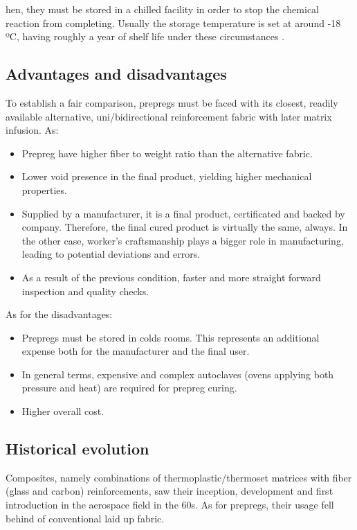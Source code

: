 hen, they must be stored in a chilled facility in order to stop the chemical
reaction from completing. Usually the storage temperature is set at around -18 ºC,
having roughly a year of shelf life under these circumstances \cite{Schmidt2018}.\\

\subsection{Advantages and disadvantages}

To establish a fair comparison, prepregs must be faced with its closest, readily
available alternative, uni/bidirectional reinforcement fabric with later matrix
infusion. As:

\begin{itemize}
	\item Prepreg have higher fiber to weight ratio than the alternative fabric.
	\item Lower void presence in the final product, yielding higher mechanical properties.
	\item Supplied by a manufacturer, it is a final product, certificated and
	backed by company. Therefore, the final cured product is virtually the same,
	always. In the other case, worker’s craftsmanship plays a bigger role in
	manufacturing, leading to potential deviations and errors.
	\item As a result of the previous condition, faster and more straight
	forward inspection and quality checks.
\end{itemize}

As for the disadvantages:

\begin{itemize}
	\item Prepregs must be stored in colds rooms. This represents an additional
	expense both for the manufacturer and the final user.
	\item In general terms, expensive and complex autoclaves (ovens applying
	both pressure and heat) are required for prepreg curing.
	\item Higher overall cost.
\end{itemize}

\subsection{Historical evolution}

Composites, namely combinations of thermoplastic/thermoset matrices with fiber
(glass and carbon) reinforcements, saw their inception, development and first
introduction in the aerospace field in the 60s. As for prepregs, their usage fell
behind of conventional laid up fabric.\\

